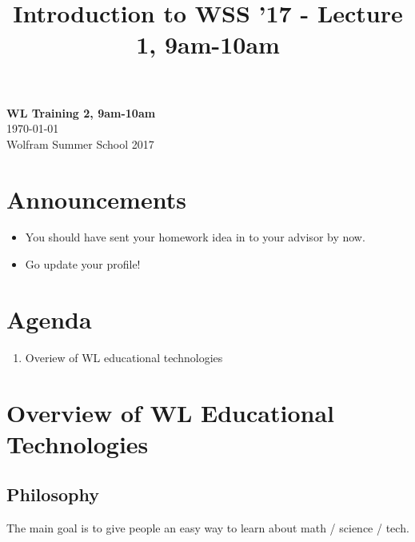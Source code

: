 \documentclass[11pt]{article}
\theoremstyle{definition}
\begin{document}
\title{Introduction to WSS '17 - Lecture 1, 9am-10am}

\thispagestyle{empty}
\begin{center}
{\LARGE \bf WL Training 2, 9am-10am}\\
\medskip
{\Large \today}\\
\smallskip
{\large Wolfram Summer School 2017}
\end{center}

\section*{Announcements}
\begin{itemize}
\item You should have sent your homework idea in to your advisor by now.
\item Go update your profile!
\end{itemize}

\noindent\hrulefill



\section*{Agenda}
\begin{enumerate}
\item Overiew of WL educational technologies
\end{enumerate}

\noindent\hrulefill




\section{Overview of WL Educational Technologies}

\subsection{Philosophy}

The main goal is to give people an easy way to learn about math / science / tech. 
\end{document}
